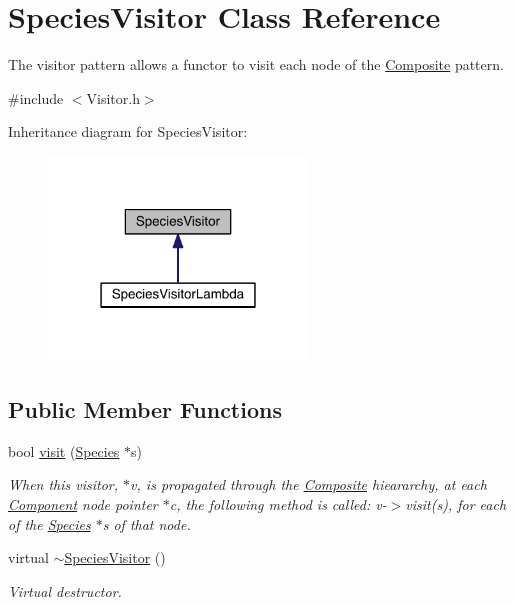 \hypertarget{classSpeciesVisitor}{\section{Species\+Visitor Class Reference}
\label{classSpeciesVisitor}
}


The visitor pattern allows a functor to visit each node of the \hyperlink{classComposite}{Composite} pattern.  




{\ttfamily \#include $<$Visitor.\+h$>$}



Inheritance diagram for Species\+Visitor\+:\nopagebreak
\begin{figure}[H]
\begin{center}
\leavevmode
\includegraphics[width=195pt]{classSpeciesVisitor__inherit__graph}
\end{center}
\end{figure}
\subsection*{Public Member Functions}
\begin{DoxyCompactItemize}
\item 
bool \hyperlink{classSpeciesVisitor_a1a3573d237d36307cc35e123e67875db}{visit} (\hyperlink{classSpecies}{Species} $\ast$s)
\begin{DoxyCompactList}\small\item\em When this visitor, $\ast$v, is propagated through the \hyperlink{classComposite}{Composite} hieararchy, at each \hyperlink{classComponent}{Component} node pointer $\ast$c, the following method is called\+: v-\/$>$visit(s), for each of the \hyperlink{classSpecies}{Species} $\ast$s of that node. \end{DoxyCompactList}\item 
virtual \hyperlink{classSpeciesVisitor_a07365fea8fc4e68898f68476d6da0064}{$\sim$\+Species\+Visitor} ()
\begin{DoxyCompactList}\small\item\em Virtual destructor. \end{DoxyCompactList}\end{DoxyCompactItemize}
